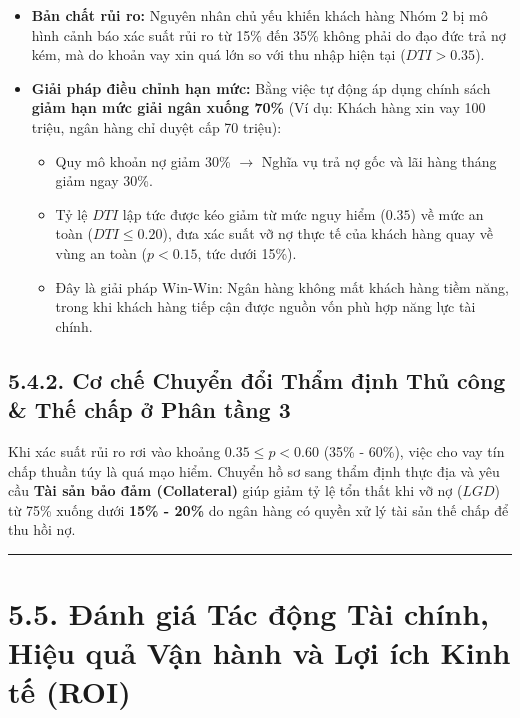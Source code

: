 \documentclass[
  13pt,
  a4paper,
]{report}
\providecommand{\tightlist}{%
  \setlength{\itemsep}{0pt}\setlength{\parskip}{0pt}}
\begin{document}
\begin{itemize}
\tightlist
\item
  \textbf{Bản chất rủi ro:} Nguyên nhân chủ yếu khiến khách hàng Nhóm 2
  bị mô hình cảnh báo xác suất rủi ro từ 15\% đến 35\% không phải do đạo
  đức trả nợ kém, mà do khoản vay xin quá lớn so với thu nhập hiện tại
  (\(DTI > 0.35\)).
\item
  \textbf{Giải pháp điều chỉnh hạn mức:} Bằng việc tự động áp dụng chính
  sách \textbf{giảm hạn mức giải ngân xuống 70\%} (Ví dụ: Khách hàng xin
  vay 100 triệu, ngân hàng chỉ duyệt cấp 70 triệu):

  \begin{itemize}
  \tightlist
  \item
    Quy mô khoản nợ giảm 30\% \(\rightarrow\) Nghĩa vụ trả nợ gốc và lãi
    hàng tháng giảm ngay 30\%.
  \item
    Tỷ lệ \(DTI\) lập tức được kéo giảm từ mức nguy hiểm (\(0.35\)) về
    mức an toàn (\(DTI \le 0.20\)), đưa xác suất vỡ nợ thực tế của khách
    hàng quay về vùng an toàn (\(p < 0.15\), tức dưới 15\%).
  \item
    Đây là giải pháp Win-Win: Ngân hàng không mất khách hàng tiềm năng,
    trong khi khách hàng tiếp cận được nguồn vốn phù hợp năng lực tài
    chính.
  \end{itemize}
\end{itemize}

\subsection{5.4.2. Cơ chế Chuyển đổi Thẩm định Thủ công \& Thế chấp ở
Phân tầng
3}\label{cux1a1-chux1ebf-chuyux1ec3n-ux111ux1ed5i-thux1ea9m-ux111ux1ecbnh-thux1ee7-cuxf4ng-thux1ebf-chux1ea5p-ux1edf-phuxe2n-tux1ea7ng-3}

Khi xác suất rủi ro rơi vào khoảng \(0.35 \le p < 0.60\) (35\% - 60\%),
việc cho vay tín chấp thuần túy là quá mạo hiểm. Chuyển hồ sơ sang thẩm
định thực địa và yêu cầu \textbf{Tài sản bảo đảm (Collateral)} giúp giảm
tỷ lệ tổn thất khi vỡ nợ (\(LGD\)) từ 75\% xuống dưới \textbf{15\% -
20\%} do ngân hàng có quyền xử lý tài sản thế chấp để thu hồi nợ.

\begin{center}\rule{0.5\linewidth}{0.5pt}\end{center}

\section{5.5. Đánh giá Tác động Tài chính, Hiệu quả Vận hành và Lợi ích
Kinh tế
(ROI)}\label{ux111uxe1nh-giuxe1-tuxe1c-ux111ux1ed9ng-tuxe0i-chuxednh-hiux1ec7u-quux1ea3-vux1eadn-huxe0nh-vuxe0-lux1ee3i-uxedch-kinh-tux1ebf-roi}
\end{document}
